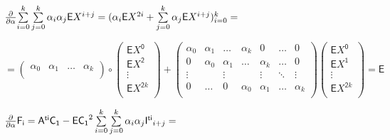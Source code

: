 \documentclass[a4paper,12pt]{article}
\begin{document}
\begin{center}
    ${\partial\over{\partial \alpha}} {\sum\limits_{i = 0}^k}\sum\limits_{j=0}^k\alpha_i \alpha_j \mathsf{E}X^{i + j} = (\alpha_i\mathsf{E}X^{2i} + \sum\limits_{j = 0}^k \alpha_j \mathsf{E}X^{i + j})_{i = 0}^k =$
\end{center}

\begin{displaymath}
    = \begin{pmatrix}
        \alpha_0 & \alpha_1 & \ldots & \alpha_k \\
    \end{pmatrix} \circ \begin{pmatrix}
        \mathsf{E}X^{\mathsf{0}} \\ \mathsf{E}X^\mathsf{2} \\ \vdots \\ \mathsf{E}X^{\mathsf{2}k} \\
    \end{pmatrix} + \begin{pmatrix}
        \alpha_0 & \alpha_1 & \ldots & \alpha_k & 0 & \ldots & 0 \\
        0 & \alpha_0 & \alpha_1 & \ldots & \alpha_k & \ldots & 0 \\
        \vdots &  & \vdots &  & \vdots & \ddots & \vdots\\
        0 & \ldots & 0 & \alpha_0 & \alpha_1 &\ldots & \alpha_k \\
    \end{pmatrix} \begin{pmatrix}
        \mathsf{E}X^{\mathsf{0}} \\ \mathsf{E}X^\mathsf{1} \\ \vdots \\ \mathsf{E}X^{\mathsf{2}k} \\
    \end{pmatrix} = \mathsf{E}
\end{displaymath}

\begin{center}
    ${\partial\over{\partial \alpha}} \mathsf{F_i} = {\mathsf{A^{ti}}\mathsf{C_1}} - {\mathsf{E}\mathsf{C_1}^2 \sum\limits_{i = 0}^k \sum\limits_{j = 0}^k \alpha_i \alpha_j \mathsf{I^{ti}}_{i + j}} =$
\end{center}
\end{document}
